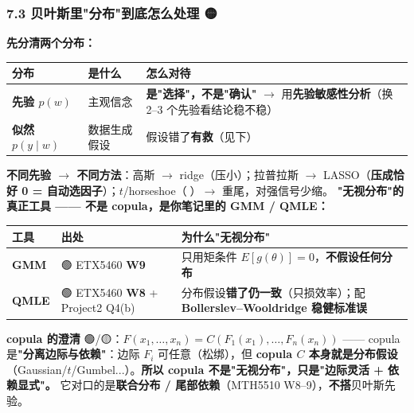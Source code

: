 \documentclass[11pt]{article}
\begin{document}
\subsubsection{\texorpdfstring{7.3 贝叶斯里"分布"到底怎么处理 🟡}{7.3 贝叶斯里"分布"到底怎么处理 🟡}}
\textbf{先分清两个分布：}
{\small
\begin{longtable}{p{2.18cm}p{1.87cm}p{12.15cm}}
\toprule
分布 & 是什么 & 怎么对待 \\
\midrule
\textbf{先验 $p(w)$} & 主观信念 & \textbf{是"选择"，不是"确认"} \ensuremath{\rightarrow} 用\textbf{先验敏感性分析}（换 2--3 个先验看结论稳不稳） \\
\textbf{似然 $p(y\mid w)$} & 数据生成假设 & 假设错了\textbf{有救}（见下） \\
\bottomrule
\end{longtable}
}
\textbf{不同先验 \ensuremath{\rightarrow} 不同方法}：高斯 \ensuremath{\rightarrow} ridge（压小）；拉普拉斯 \ensuremath{\rightarrow} LASSO（\textbf{压成恰好 0 = 自动选因子}）；$t$/horseshoe（🔴）\ensuremath{\rightarrow} 重尾，对强信号少缩。
\textbf{"无视分布"的真正工具 ------ 不是 copula，是你笔记里的 GMM / QMLE：}
{\small
\begin{longtable}{p{1.28cm}p{4.61cm}p{10.31cm}}
\toprule
工具 & 出处 & 为什么"无视分布" \\
\midrule
\textbf{GMM} & 🟢 ETX5460 \textbf{W9} & 只用矩条件 $E[g(\theta)]=0$，\textbf{不假设任何分布} \\
\textbf{QMLE} & 🟢 ETX5460 \textbf{W8} + Project2 Q4(b) & 分布假设\textbf{错了仍一致}（只损效率）；配 \textbf{Bollerslev--Wooldridge 稳健标准误} \\
\bottomrule
\end{longtable}
}
\textbf{copula 的澄清} 🟢/🟡：$F(x_1,\dots,x_n)=C(F_1(x_1),\dots,F_n(x_n))$ ------ copula 是\textbf{"分离边际与依赖"}：边际 $F_i$ 可任意（松绑），但 \textbf{copula $C$ 本身就是分布假设}（Gaussian/$t$/Gumbel...）。\textbf{所以 copula 不是"无视分布"，只是"边际灵活 + 依赖显式"。} 它对口的是\textbf{联合分布 / 尾部依赖}（MTH5510 W8--9），\textbf{不搭}贝叶斯先验。
\end{document}
